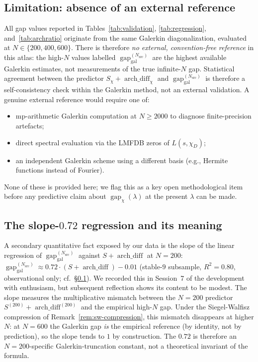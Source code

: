 \documentclass[10pt,twocolumn]{article}
\theoremstyle{definition}
\theoremstyle{remark}
\newcommand{\gap}{\operatorname{gap}}
\newcommand{\chifn}{\chi}
\newcommand{\archdiff}{\operatorname{arch\_diff}}
\begin{document}
\subsection{Limitation: absence of an external reference}
\label{sec:limitation-external}

All gap values reported in Tables~\ref{tab:validation},
\ref{tab:regression}, and~\ref{tab:archratio} originate from the
same Galerkin diagonalization, evaluated at $N\in\{200,400,600\}$.
There is therefore \emph{no external, convention-free reference} in
this atlas: the high-$N$ values labelled
$\gap_{\mathrm{gal}}^{(N_{\mathrm{src}})}$ are the highest available
Galerkin estimates, not measurements of the true infinite-$N$ gap.
Statistical agreement between the predictor $S_\chi+\archdiff_\chi$
and $\gap_{\mathrm{gal}}^{(N_{\mathrm{src}})}$ is therefore a
self-consistency check within the Galerkin method, not an external
validation. A genuine external reference would require one of:
\begin{itemize}
\item[(i)] mp-arithmetic Galerkin computation at $N\geq 2000$ to
  diagnose finite-precision artefacts;
\item[(ii)] direct spectral evaluation via the LMFDB zeros of
  $L(s,\chifn_D)$;
\item[(iii)] an independent Galerkin scheme using a different basis
  (e.g., Hermite functions instead of Fourier).
\end{itemize}
None of these is provided here; we flag this as a key open
methodological item before any predictive claim about
$\gap_{\chifn}(\lambda)$ at the present $\lambda$ can be made.

\subsection{\texorpdfstring{The slope-$0.72$ regression and its meaning}{The slope-0.72 regression and its meaning}}
\label{sec:discussion-slope}

A secondary quantitative fact exposed by our data is the slope of
the linear regression of $\gap_{\mathrm{gal}}^{(N_{\mathrm{src}})}$
against $S+\archdiff$ at $N=200$:
$\gap_{\mathrm{gal}}^{(N_{\mathrm{src}})}\approx 0.72\cdot
(S+\archdiff)-0.01$
(stable-$9$ subsample, $R^2=0.80$, observational only; cf.\
\S\ref{sec:limitation-external}). We recorded this in Session~7 of
the development with enthusiasm, but subsequent reflection shows
its content to be modest. The slope measures the multiplicative
mismatch between the $N=200$ predictor $S^{(200)}+\archdiff^{(200)}$
and the empirical high-$N$ gap. Under the Siegel-Walfisz
compression of Remark~\ref{rem:sw-compression}, this mismatch
disappears at higher $N$: at $N=600$ the Galerkin gap \emph{is}
the empirical reference (by identity, not by prediction), so the
slope tends to $1$ by construction. The $0.72$ is therefore an
$N=200$-specific Galerkin-truncation constant, not a theoretical
invariant of the formula.
\end{document}
